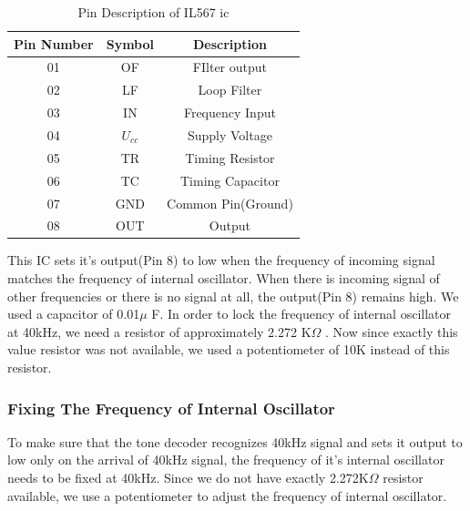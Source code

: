 \begin{table}[h!]
	\centering
	\caption{Pin Description of IL567 \gls{ic}\cite{ToneDecoder}}
	\begin{tabular}{|c|c|c|}
		\hline 
		\bf{Pin Number} & \bf{Symbol} & \bf{Description} \\ 
		\hline 
		01 & OF & FIlter output \\	
		02 & LF & Loop Filter \\
		03 & IN & Frequency Input \\	  
		04 & $U_{cc}$ & Supply Voltage \\	  
		05 & TR & Timing Resistor \\	  
		06 & TC & Timing Capacitor \\	  
		07 & GND & Common Pin(Ground) \\	  
		08 & OUT & Output \\ 
		\hline 
	\end{tabular} 
\end{table}

This IC sets it's output(Pin 8) to low when the frequency of incoming signal matches the frequency of internal oscillator. When there is incoming signal of other frequencies or there is no signal at all, the output(Pin 8) remains high. 
We used a capacitor of 0.01$\mu$ F. In order to lock the frequency of internal oscillator at 40kHz, we need a resistor of approximately 2.272 K$\Omega$ . Now since exactly this value resistor was not available, we used a potentiometer of 10K instead of this resistor. 

\subsubsection{Fixing The Frequency of Internal Oscillator}

To make sure that the tone decoder recognizes 40kHz signal and sets it output to low only on the arrival of 40kHz signal, the frequency of it's internal oscillator needs to be fixed at 40kHz. Since we do not have exactly 2.272K$\Omega$ resistor available, we use a potentiometer to adjust the frequency of internal oscillator.

